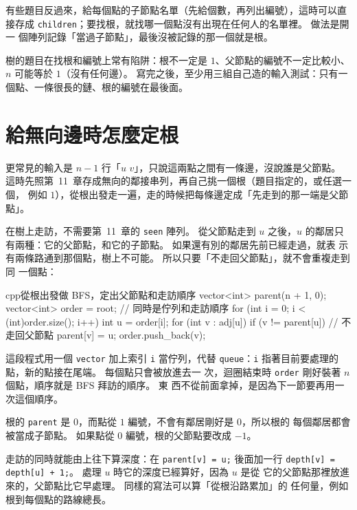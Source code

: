 有些題目反過來，給每個點的子節點名單（先給個數，再列出編號），這時可以直接存成
\texttt{children}；要找根，就找哪一個點沒有出現在任何人的名單裡。 做法是開一
個陣列記錄「當過子節點」，最後沒被記錄的那一個就是根。

\begin{apcsnote}
樹的題目在找根和編號上常有陷阱：根不一定是 $1$、父節點的編號不一定比較小、
$n$ 可能等於 $1$（沒有任何邊）。 寫完之後，至少用三組自己造的輸入測試：只有一
個點、一條很長的鏈、根的編號在最後面。
\end{apcsnote}

\section{給無向邊時怎麼定根}
\label{sec:tree-rooting}

更常見的輸入是 $n - 1$ 行「$u$ $v$」，只說這兩點之間有一條邊，沒說誰是父節點。
這時先照第~11~章存成無向的鄰接串列，再自己挑一個根（題目指定的，或任選一個，
例如 $1$），從根出發走一遍，走的時候把每條邊定成「先走到的那一端是父節點」。

在樹上走訪，不需要第~11~章的 \texttt{seen} 陣列。 從父節點走到 $u$ 之後，$u$
的鄰居只有兩種：它的父節點，和它的子節點。 如果還有別的鄰居先前已經走過，就表
示有兩條路通到那個點，樹上不可能。 所以只要「不走回父節點」，就不會重複走到同
一個點：

\begin{code}{cpp}{從根出發做 BFS，定出父節點和走訪順序}
vector<int> parent(n + 1, 0);
vector<int> order = {root};             // 同時是佇列和走訪順序
for (int i = 0; i < (int)order.size(); i++) {
    int u = order[i];
    for (int v : adj[u]) {
        if (v != parent[u]) {           // 不走回父節點
            parent[v] = u;
            order.push_back(v);
        }
    }
}
\end{code}

這段程式用一個 \texttt{vector} 加上索引 \texttt{i} 當佇列，代替
\texttt{queue}：\texttt{i} 指著目前要處理的點，新的點接在尾端。 每個點只會被放進去一
次，迴圈結束時 \texttt{order} 剛好裝著 $n$ 個點，順序就是 BFS 拜訪的順序。 東
西不從前面拿掉，是因為下一節要再用一次這個順序。

根的 \texttt{parent} 是 $0$，而點從 $1$ 編號，不會有鄰居剛好是 $0$，所以根的
每個鄰居都會被當成子節點。 如果點從 $0$ 編號，根的父節點要改成 $-1$。

走訪的同時就能由上往下算深度：在 \texttt{parent[v] = u;} 後面加一行
\texttt{depth[v] = depth[u] + 1;}。 處理 $u$ 時它的深度已經算好，因為 $u$ 是從
它的父節點那裡放進來的，父節點比它早處理。 同樣的寫法可以算「從根沿路累加」的
任何量，例如根到每個點的路線總長。

